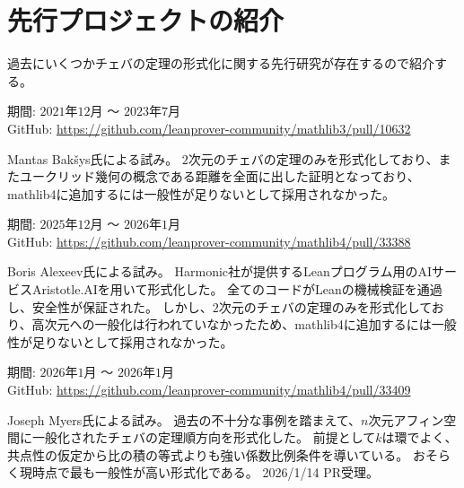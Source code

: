 \documentclass[a4paper,12pt]{bxjsbook}
\newlength{\customindent}
\newenvironment{body}{
  \par
  \begingroup
  \setlength{\leftskip}{\customindent}
  \setlength{\rightskip}{0pt}
  \setlength{\parindent}{1em}
  \setlength{\displayindent}{\customindent}
  \setlength{\displaywidth}{\dimexpr\linewidth-\customindent\relax}
}{
  \par
  \endgroup
}
\theoremstyle{theorem}
\begin{document}
    \section{先行プロジェクトの紹介}
    \begin{body}
        過去にいくつかチェバの定理の形式化に関する先行研究が存在するので紹介する。
    \end{body}
    
    \begin{bodydescription}
        \item[\hspace*{1.5em}・Lean3時代の形式化] 
            期間: $2021$年$12$月 〜 $2023$年$7$月\\
            GitHub: \url{https://github.com/leanprover-community/mathlib3/pull/10632} \cite{mathlib3_ceva}
            
            Mantas Bakšys氏による試み。
            $2$次元のチェバの定理のみを形式化しており、またユークリッド幾何の概念である距離を全面に出した証明となっており、mathlib4に追加するには一般性が足りないとして採用されなかった。
        
        \item[\hspace*{1.5em}・Aristotle.AI（Harmonic社）を用いた形式化]
            期間: $2025$年$12$月 〜 $2026$年$1$月\\
            GitHub: \url{https://github.com/leanprover-community/mathlib4/pull/33388} \cite{mathlib4_ceva_alexeev}
            
            Boris Alexeev氏による試み。
            Harmonic社が提供するLeanプログラム用のAIサービスAristotle.AIを用いて形式化した。
            全てのコードがLeanの機械検証を通過し、安全性が保証された。
            しかし、$2$次元のチェバの定理のみを形式化しており、高次元への一般化は行われていなかったため、mathlib4に追加するには一般性が足りないとして採用されなかった。
        
        \item[\hspace*{1.5em}・$n$次元アフィン空間で汎用一般化された初の形式化]
            期間: $2026$年$1$月 〜 $2026$年$1$月\\
            GitHub: \url{https://github.com/leanprover-community/mathlib4/pull/33409} \cite{mathlib4_ceva_myers}
            
            Joseph Myers氏による試み。
            過去の不十分な事例を踏まえて、$n$次元アフィン空間に一般化されたチェバの定理順方向を形式化した。
            前提として$k$は環でよく、共点性の仮定から比の積の等式よりも強い係数比例条件を導いている。
            おそらく現時点で最も一般性が高い形式化である。
            2026/1/14 PR受理。
    \end{bodydescription}
\end{document}

